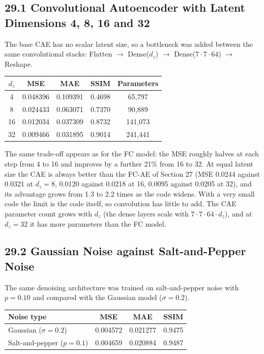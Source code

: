 \documentclass[10pt]{article}
\begin{document}
\subsection*{29.1 Convolutional Autoencoder with Latent Dimensions 4, 8, 16 and 32}

The base CAE has no scalar latent size, so a bottleneck was added between the
same convolutional stacks: Flatten $\rightarrow$ Dense($d_z$) $\rightarrow$
Dense($7\cdot7\cdot64$) $\rightarrow$ Reshape.

\begin{center}
\begin{tabular}{|c|c|c|c|c|}
\hline
$d_z$ & MSE & MAE & SSIM & Parameters\\
\hline
4 & 0.048396 & 0.109391 & 0.4698 & 65,797\\
8 & 0.024433 & 0.063071 & 0.7370 & 90,889\\
16 & 0.012034 & 0.037309 & 0.8732 & 141,073\\
32 & 0.009466 & 0.031895 & 0.9014 & 241,441\\
\hline
\end{tabular}
\end{center}

The same trade-off appears as for the FC model: the MSE roughly halves at each
step from 4 to 16 and improves by a further 21\% from 16 to 32. At equal latent
size the CAE is always better than the FC-AE of Section 27 (MSE 0.0244 against
0.0321 at $d_z=8$, 0.0120 against 0.0218 at 16, 0.0095 against 0.0205 at 32), and
its advantage grows from 1.3 to 2.2 times as the code widens. With a very small
code the limit is the code itself, so convolution has little to add. The CAE
parameter count grows with $d_z$ (the dense layers scale with
$7\cdot7\cdot64\cdot d_z$), and at $d_z=32$ it has more parameters than the FC model.

\subsection*{29.2 Gaussian Noise against Salt-and-Pepper Noise}

The same denoising architecture was trained on salt-and-pepper noise with
$p=0.10$ and compared with the Gaussian model ($\sigma=0.2$).

\begin{center}
\begin{tabular}{|l|c|c|c|}
\hline
Noise type & MSE & MAE & SSIM\\
\hline
Gaussian ($\sigma=0.2$) & 0.004572 & 0.021277 & 0.9475\\
Salt-and-pepper ($p=0.1$) & 0.004659 & 0.020884 & 0.9487\\
\hline
\end{tabular}
\end{center}
\end{document}
